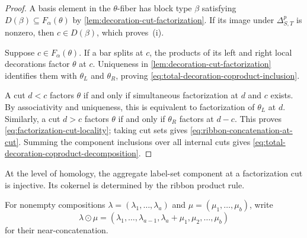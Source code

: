 \documentclass{amsart}
\theoremstyle{definition}
\theoremstyle{remark}
\begin{document}
\begin{proof}
A basis element in the $\theta$-fiber has block type $\beta$ satisfying
$D(\beta)\subseteq F_\alpha(\theta)$ by
\cref{lem:decoration-cut-factorization}.  If its image under
$\Delta^p_{S,T}$ is nonzero, then $c\in D(\beta)$, which proves~\textup{(i)}.

Suppose $c\in F_\alpha(\theta)$.  If a bar splits at $c$, the products of its
left and right local decorations factor $\theta$ at $c$.  Uniqueness in
\cref{lem:decoration-cut-factorization} identifies them with $\theta_L$ and
$\theta_R$, proving \eqref{eq:total-decoration-coproduct-inclusion}.

A cut $d<c$ factors $\theta$ if and only if simultaneous factorization at
$d$ and $c$ exists.  By associativity and uniqueness, this is equivalent to
factorization of $\theta_L$ at $d$.  Similarly, a cut $d>c$ factors $\theta$
if and only if $\theta_R$ factors at $d-c$.  This proves
\eqref{eq:factorization-cut-locality}; taking cut sets gives
\eqref{eq:ribbon-concatenation-at-cut}.  Summing the component inclusions over
all internal cuts gives
\eqref{eq:total-decoration-coproduct-decomposition}.
\end{proof}

At the level of homology, the aggregate label-set component at a
factorization cut is injective.  Its cokernel is determined by the ribbon
product rule.

For nonempty compositions $\lambda=(\lambda_1,\ldots,\lambda_a)$ and
$\mu=(\mu_1,\ldots,\mu_b)$, write
\[
 \lambda\odot\mu
 = (\lambda_1,\ldots,\lambda_{a-1},
    \lambda_a+\mu_1,\mu_2,\ldots,\mu_b)
\]
for their near-concatenation.
\end{document}
